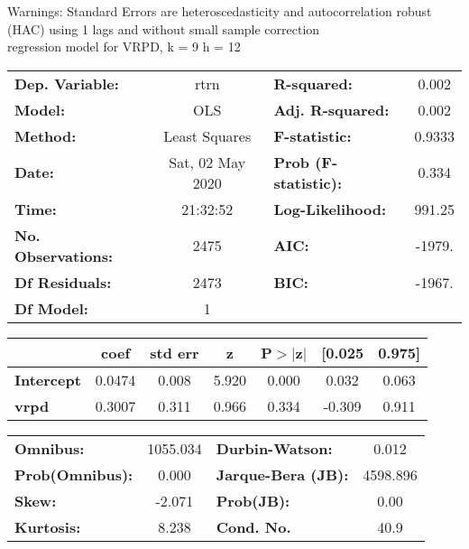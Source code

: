 Warnings: \newline
 [1] Standard Errors are heteroscedasticity and autocorrelation robust (HAC) using 1 lags and without small sample correction\\ 

regression model for VRPD, k = 9 h = 12\begin{center}
\begin{tabular}{lclc}
\toprule
\textbf{Dep. Variable:}    &       rtrn       & \textbf{  R-squared:         } &     0.002   \\
\textbf{Model:}            &       OLS        & \textbf{  Adj. R-squared:    } &     0.002   \\
\textbf{Method:}           &  Least Squares   & \textbf{  F-statistic:       } &    0.9333   \\
\textbf{Date:}             & Sat, 02 May 2020 & \textbf{  Prob (F-statistic):} &    0.334    \\
\textbf{Time:}             &     21:32:52     & \textbf{  Log-Likelihood:    } &    991.25   \\
\textbf{No. Observations:} &        2475      & \textbf{  AIC:               } &    -1979.   \\
\textbf{Df Residuals:}     &        2473      & \textbf{  BIC:               } &    -1967.   \\
\textbf{Df Model:}         &           1      & \textbf{                     } &             \\
\bottomrule
\end{tabular}
\begin{tabular}{lcccccc}
                   & \textbf{coef} & \textbf{std err} & \textbf{z} & \textbf{P$> |$z$|$} & \textbf{[0.025} & \textbf{0.975]}  \\
\midrule
\textbf{Intercept} &       0.0474  &        0.008     &     5.920  &         0.000        &        0.032    &        0.063     \\
\textbf{vrpd}      &       0.3007  &        0.311     &     0.966  &         0.334        &       -0.309    &        0.911     \\
\bottomrule
\end{tabular}
\begin{tabular}{lclc}
\textbf{Omnibus:}       & 1055.034 & \textbf{  Durbin-Watson:     } &    0.012  \\
\textbf{Prob(Omnibus):} &   0.000  & \textbf{  Jarque-Bera (JB):  } & 4598.896  \\
\textbf{Skew:}          &  -2.071  & \textbf{  Prob(JB):          } &     0.00  \\
\textbf{Kurtosis:}      &   8.238  & \textbf{  Cond. No.          } &     40.9  \\
\bottomrule
\end{tabular}
\end{center}

